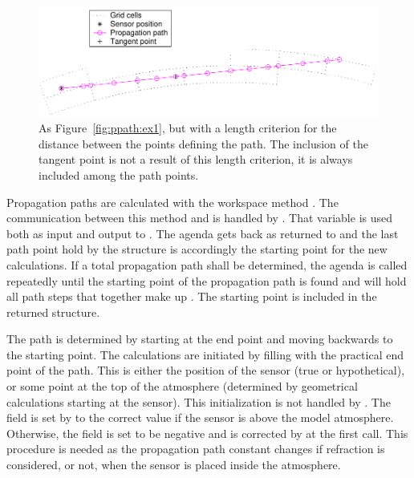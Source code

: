 \begin{figure}[!t]
 \begin{center}
   \includegraphics*[width=0.98\hsize]{Figs/ppath/ppath_ex2}
  \caption{As Figure~\ref{fig:ppath:ex1}, but with a length criterion 
    for the distance between the points defining the path.
    The inclusion of the tangent point is not a result of this length
    criterion, it is always included among the path points.}
  \label{fig:ppath:ex2}  
 \end{center}
\end{figure}


Propagation paths are calculated with the workspace method
. The communication between this method and
 is handled by .
That variable is used both as input and output to
.  The agenda gets back
 as returned to  and the
last path point hold by the structure is accordingly the starting
point for the new calculations. If a total propagation path shall be
determined, the agenda is called repeatedly until the starting point
of the propagation path is found and  will hold
all path steps that together make up . The starting
point is included in the returned structure.

The path is determined by starting at the end point and moving
backwards to the starting point. The calculations are initiated by
filling  with the practical end point of the
path. This is either the position of the sensor (true or
hypothetical), or some point at the top of the atmosphere (determined
by geometrical calculations starting at the sensor). This
initialization is not handled by . 
The field  is set by 
to the correct value if the sensor is above the model atmosphere.
Otherwise, the field is set to be negative and is corrected by
 at the first call. This procedure is
needed as the propagation path constant changes if refraction is
considered, or not, when the sensor is placed inside the atmosphere.

